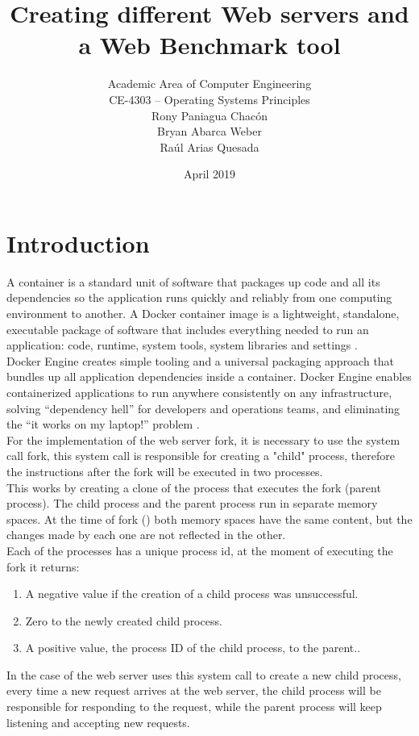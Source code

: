 \documentclass{article}
\title{Creating different Web servers and a Web Benchmark tool}
\author{
Academic Area of Computer Engineering\\
CE-4303 – Operating Systems Principles\\
Rony Paniagua Chacón\\
Bryan Abarca Weber\\
Raúl Arias Quesada}
\date{April 2019}
\begin{document}
\maketitle

\section{Introduction}
A container is a standard unit of software that packages up code and all its dependencies so the application runs quickly and reliably from one computing environment to another. A Docker container image is a lightweight, standalone, executable package of software that includes everything needed to run an application: code, runtime, system tools, system libraries and settings \cite{WhatDocker}.\\
Docker Engine creates simple tooling and a universal packaging approach that bundles up all application dependencies inside a container. Docker Engine enables containerized applications to run anywhere consistently on any infrastructure, solving “dependency hell” for developers and operations teams, and eliminating the “it works on my laptop!” problem \cite{DockerEngine}.
\\For the implementation of the web server fork, it is necessary to use the system call fork, this system call is responsible for creating a "child" process, therefore the instructions after the fork will be executed in two processes.
\\This works by creating a clone of the process that executes the fork (parent process). The child process and the parent process run in separate memory spaces. At the time of fork () both memory spaces have the same content, but the changes made by each one are not reflected in the other.
\\Each of the processes has a unique process id, at the moment of executing the fork it returns:
\begin{enumerate}
    \item A negative value if the creation of a child process was unsuccessful.
    \item Zero to the newly created child process.
    \item A positive value, the process ID of the child process, to the parent.\cite{Fork}.
\end{enumerate}
In the case of the web server uses this system call to create a new child process, every time a new request arrives at the web server, the child process will be responsible for responding to the request, while the parent process will keep listening and accepting new requests.
\end{document}

